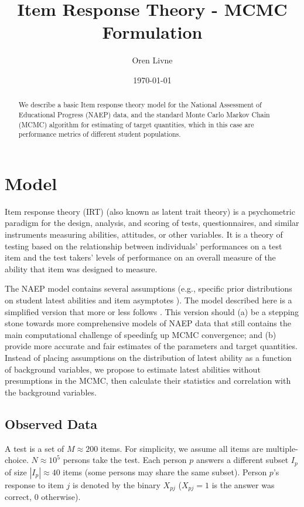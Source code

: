 \documentclass{article}
\begin{document}
\title{Item Response Theory - MCMC Formulation}
\author{Oren Livne}
\date{\today}

\maketitle

\begin{abstract}
  We describe a basic Item response theory model for the National Assessment of
  Educational Progress (NAEP) data, and the standard Monte Carlo Markov Chain (MCMC)
  algorithm for estimating of target quantities, which in this case are
  performance metrics of different student populations.
\end{abstract}

\section{Model}
Item response theory (IRT) (also known as latent trait theory) is a psychometric paradigm for the design, analysis, and scoring of tests, questionnaires, and similar instruments measuring abilities, attitudes, or other variables. It is a theory of testing based on the relationship between individuals' performances on a test item and the test takers' levels of performance on an overall measure of the ability that item was designed to measure.

The NAEP model contains several assumptions (e.g., specific prior distributions on student
latest abilities and item asymptotes \cite{matt02}). The model described here is a simplified
version that more or less follows \cite[Sec. 1.7]{junker}. This version should (a) be a stepping
stone towards more comprehensive models of NAEP data that still contains the main computational
challenge of speedinfg up MCMC convergence; and (b) provide more accurate and fair estimates
of the parameters and target quantities. Instead of placing assumptions on the distribution of
latest ability as a function of background variables, we propose to estimate latest abilities
without presumptions in the MCMC, then calculate their statistics and correlation with
the background variables. 

\subsection{Observed Data}
A test is a set of $M \approx 200$ items. For simplicity, we assume all items are multiple-choice. $N \approx 10^5$ persons take the test. Each person $p$ answers a different subset $I_p$ of size $|I_p| \approx 40$ items (some persons may share the same subset). Person $p$'s response to item $j$ is denoted by the binary $X_{pj}$ ($X_{pj}=1$ is the answer was correct, $0$ otherwise).
\end{document}
